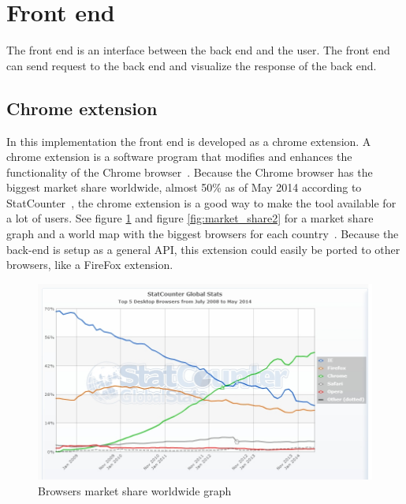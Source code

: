 \documentclass[twoside,openright,notitlepage]{uva-bachelor-thesis}
\begin{document}
\FloatBarrier
\section{Front end}
The front end is an interface between the back end and the user. The front end can send request to the back end and visualize the response of the back end.

\subsection{Chrome extension}
In this implementation the front end is developed as a chrome extension. A chrome extension is a software program that modifies and enhances the functionality of the Chrome browser~\cite{google3}. Because the Chrome browser has the biggest market share worldwide, almost 50\% as of May 2014 according to StatCounter~\cite{stats}, the chrome extension is a good way to make the tool available for a lot of users. See figure \ref{fig:market_share1} and figure \ref{fig:market_share2} for a market share graph and a world map with the biggest browsers for each country~\cite{stats}. Because the back-end is setup as a general API, this extension could easily be ported to other browsers, like a FireFox extension.

\begin{figure}[h!]
    \centering
    \includegraphics[width=1.0\textwidth, center]{img/market_share1.jpg}
    \caption{Browsers market share worldwide graph}
    \label{fig:market_share1}
\end{figure}
\end{document}
